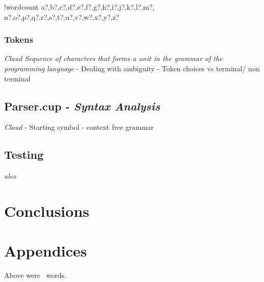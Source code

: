 \documentclass[fontsize=10pt]{extarticle}
\numberwithin{figure}{section} %
\newcounter{words}
\newenvironment{counted}{%
  \setcounter{words}{0}
  \SearchList!{wordcount}{\stepcounter{words}}
    {a?,b?,c?,d?,e?,f?,g?,h?,i?,j?,k?,l?,m?,
    n?,o?,p?,q?,r?,s?,t?,u?,v?,w?,x?,y?,z?}
  \UndoBoundary{'}
  \SearchOrder{p;}}{%
  \StopSearching}
\begin{document}
\begin{counted}
\subsubsection{Tokens}\label{tokens}

\emph{Claud Sequence of characters that forms a unit in the grammar of
the programming language} - Dealing with ambiguity - Token choices vs
terminal/ non terminal

\subsection{\texorpdfstring{Parser.cup - \emph{Syntax
Analysis}}{Parser.cup - Syntax Analysis}}\label{parser.cup---syntax-analysis}

\emph{Claud} - Starting symbol - context free grammar

\subsection{Testing}\label{testing}

\emph{alex}

\section{Conclusions}\label{conclusions}

\end{counted} %

\newpage
\section{Appendices}
Above were \thewords\ words. %
\newpage

% 

\printbibliography
\end{document}

